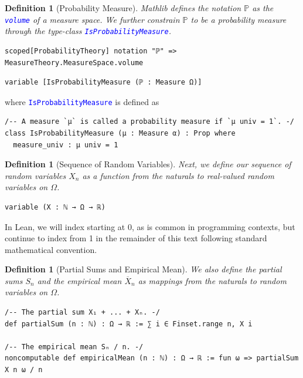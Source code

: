 \documentclass{article}
\newtheorem{definition}[theorem]{Definition}
\newcommand{\leancode}[1]{\textcolor{blue}{\nolinkurl{#1}}}
\renewcommand{\P}{\mathbb{P}}
\begin{document}
\newpage
\begin{definition}[Probability Measure]
  Mathlib defines the notation $\P$ as the \leancode{volume} of a measure space. We further constrain $\P$ to be a probability measure through the type-class \leancode{IsProbabilityMeasure}.
\end{definition}
\begin{lstlisting}[caption={Mathlib/Probability/Notation.lean}]
scoped[ProbabilityTheory] notation "ℙ" => MeasureTheory.MeasureSpace.volume
\end{lstlisting}
\begin{lstlisting}
variable [IsProbabilityMeasure (ℙ : Measure Ω)]
\end{lstlisting}
where \leancode{IsProbabilityMeasure} is defined as
\begin{lstlisting}[caption={Mathlib/MeasureTheory/Measure/Typeclasses/Probability.lean}]
/-- A measure `μ` is called a probability measure if `μ univ = 1`. -/
class IsProbabilityMeasure (μ : Measure α) : Prop where
  measure_univ : μ univ = 1
\end{lstlisting}

\begin{definition}[Sequence of Random Variables]
  Next, we define our sequence of random variables $X_n$ as a function from the naturals to real-valued random variables on $\Omega$.
\end{definition}
\begin{lstlisting}
variable (X : ℕ → Ω → ℝ)
\end{lstlisting}
In Lean, we will index starting at 0, as is common in programming contexts, but continue to index from 1 in the remainder of this text following standard mathematical convention.

\begin{definition}[Partial Sums and Empirical Mean]
  We also define the partial sums $S_n$ and the empirical mean $\overline{X}_n$ as mappings from the
  naturals to random variables on $\Omega$.
\end{definition}
\begin{lstlisting}[caption={LargeDeviations/Cramers/Basic.lean}]
/-- The partial sum X₁ + ... + Xₙ. -/
def partialSum (n : ℕ) : Ω → ℝ := ∑ i ∈ Finset.range n, X i

/-- The empirical mean Sₙ / n. -/
noncomputable def empiricalMean (n : ℕ) : Ω → ℝ := fun ω => partialSum X n ω / n
\end{lstlisting}
\end{document}
